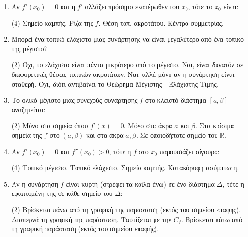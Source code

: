 \begin{enumerate}[label=\textbf{2.\arabic*.}, itemsep=4mm]
    \item Αν $f'(x_0) = 0$ και η $f'$ αλλάζει πρόσημο εκατέρωθεν του $x_0$, τότε το $x_0$ είναι:
    \begin{tasks}[label=\let\textdexiakeraia\relax\alph*.](4)
        \task Σημείο καμπής.
        \task Ρίζα της $f$.
        \task Θέση τοπ. ακροτάτου.
        \task Κέντρο συμμετρίας.
    \end{tasks}

    \item Μπορεί ένα τοπικό ελάχιστο μιας συνάρτησης να είναι μεγαλύτερο από ένα τοπικό της μέγιστο?
    \begin{tasks}[label=\let\textdexiakeraia\relax\alph*.](2)
        \task Όχι, το ελάχιστο είναι πάντα μικρότερο από το μέγιστο.
        \task Ναι, είναι δυνατόν σε διαφορετικές θέσεις τοπικών ακροτάτων.
        \task Ναι, αλλά μόνο αν η συνάρτηση είναι σταθερή.
        \task Όχι, διότι αντιβαίνει το Θεώρημα Μέγιστης - Ελάχιστης Τιμής.
    \end{tasks}

    \item Το ολικό μέγιστο μιας συνεχούς συνάρτησης $f$ στο κλειστό διάστημα $[a, \beta]$ αναζητείται:
    \begin{tasks}[label=\let\textdexiakeraia\relax\alph*.](2)
        \task Μόνο στα σημεία όπου $f'(x) = 0$.
        \task Μόνο στα άκρα $a$ και $\beta$.
        \task Στα κρίσιμα σημεία της $f$ στο $(a, \beta)$ και στα άκρα $a, \beta$.
        \task Σε οποιοδήποτε σημείο του $\mathbb{R}$.
    \end{tasks}

    \item Αν $f'(x_0) = 0$ και $f''(x_0) > 0$, τότε η $f$ στο $x_0$ παρουσιάζει σίγουρα:
    \begin{tasks}[label=\let\textdexiakeraia\relax\alph*.](4)
        \task Τοπικό μέγιστο.
        \task Τοπικό ελάχιστο.
        \task Σημείο καμπής.
        \task Κατακόρυφη ασύμπτωτη.
    \end{tasks}

    \item Αν η συνάρτηση $f$ είναι κυρτή (στρέφει τα κοίλα άνω) σε ένα διάστημα $\Delta$, τότε η εφαπτομένη της σε κάθε σημείο του $\Delta$:
    \begin{tasks}[label=\let\textdexiakeraia\relax\alph*.](2)
        \task Βρίσκεται πάνω από τη γραφική της παράσταση (εκτός του σημείου επαφής).
        \task Διαπερνά τη γραφική της παράσταση.
        \task Ταυτίζεται με την $C_f$.
        \task Βρίσκεται κάτω από τη γραφική παράσταση (εκτός του σημείου επαφής).
    \end{tasks}


\end{enumerate}
